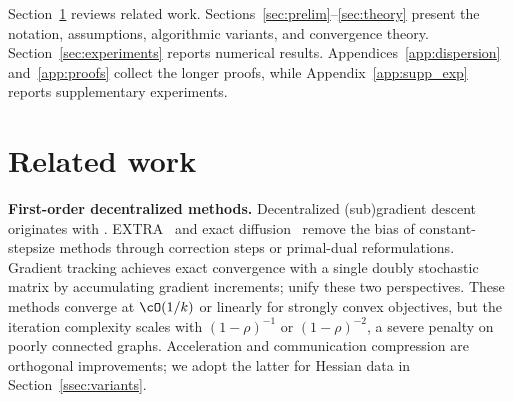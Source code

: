 \documentclass[review,onefignum,onetabnum]{siamart171218}
\begin{document}
	Section~\ref{sec:related} reviews related work.
	Sections~\ref{sec:prelim}--\ref{sec:theory} present the notation, assumptions, algorithmic variants, and convergence theory.
	Section~\ref{sec:experiments} reports numerical results.
	Appendices~\ref{app:dispersion} and~\ref{app:proofs} collect the longer proofs, while Appendix~\ref{app:supp_exp} reports supplementary experiments.
	
	\section{Related work}\label{sec:related}
	
	\noindent\textbf{First-order decentralized methods.}
	Decentralized (sub)gradient descent originates with
	\citet{nedic2009subgradient}.
	EXTRA~\citep{shi2015extra} and exact
	diffusion~\citep{yuan2019exactdiffusion} remove the bias of
	constant-stepsize methods through correction steps or primal-dual
	reformulations.
	Gradient tracking
	\citep{nedic2017diging,xin2020distributed,pu2021distributed}
	achieves exact convergence with a single doubly stochastic matrix
	by accumulating gradient increments;
	\citet{alghunaim2021decentralized} unify these two perspectives.
	These methods converge at $\cO(1/k)$ or linearly for strongly convex
	objectives, but the iteration complexity scales with
	$(1-\rho)^{-1}$ or $(1-\rho)^{-2}$, a severe penalty on poorly
	connected graphs.
	Acceleration \citep{jakovetic2014fast,li2024decentralized} and
	communication compression
	\citep{koloskova2019decentralized,beznosikov2022biased} are
	orthogonal improvements; we adopt the latter for Hessian data
	in Section~\ref{ssec:variants}.
	
\end{document}
